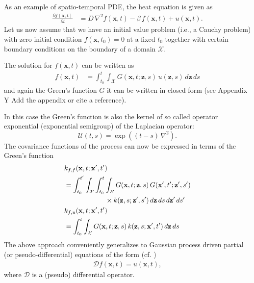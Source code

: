 \documentclass[journal]{IEEEtran}
\newcommand{\simo}[1]{{\color{red}#1}}
\begin{document}
As an example of spatio-temporal PDE, the heat equation is given as
\begin{align*}
  \frac{\partial f(\mathbf{x},t)}{\partial t} &= D \, \nabla^2 f(\mathbf{x},t) - \beta \, f(\mathbf{x},t) + u(\mathbf{x},t).
\end{align*}
%
Let us now assume that we have an initial value problem (i.e., a Cauchy problem) with zero initial condition $f(\mathbf{x},t_0) = 0$ at a fixed $t_0$ together with certain boundary conditions on the boundary of a domain $\mathcal{X}$. 

The solution for $f(\mathbf{x},t)$ can be written as
\begin{align*}
f(\mathbf{x},t) & = \int_{t_0}^t \int_{\mathcal{X}} G(\mathbf{x}, t;  \mathbf{z}, s)\,
                u(\mathbf{z},s)\,d\mathbf{z}\,ds
\end{align*}
%
and again the Green's function $G$ it can be written in closed form (see Appendix Y \simo{Add the appendix or cite a reference}).

In this case the Green's function is also the kernel of so called operator exponential (exponential semigroup) of the Laplacian operator:
%
\begin{equation}
  \mathcal{U}(t, s) = \exp\left( (t-s) \, \nabla^2 \right).
\end{equation}
%
The covariance functions of the process can now be expressed in terms of the Green's function
%
\begin{equation}
\begin{split}
  &k_{f,f}(\mathbf{x}, t; \mathbf{x}', t') \\
  &=
  \int_{t_0}^{t'} \int_{\mathcal{X}} \int_{t_0}^{t}  \int_{\mathcal{X}} 
  G(\mathbf{x}, t; \mathbf{z}, s) \,
  G(\mathbf{x}', t'; \mathbf{z}', s') \\ 
   &\qquad \qquad \qquad \times
  k(\mathbf{z}, s; \mathbf{z}', s') \, d\mathbf{z} \, ds \, d\mathbf{z}' \, ds' \\
  &k_{f,u}(\mathbf{x}, t; \mathbf{x}', t') \\
  &=
  \int_{t_0}^{t}  \int_{\mathcal{X}} 
  G(\mathbf{x}, t; \mathbf{z}, s) \,
  k(\mathbf{z}, s; \mathbf{x}', t') \, d\mathbf{z} \, ds 
\end{split}
\notag
\end{equation}
%
The above approach conveniently generalizes to Gaussian process driven partial (or pseudo-differential) equations of the form (cf. \cite{Sarkka:2011})
\begin{align*}
  \mathcal{D} f(\mathbf{x},t) = u(\mathbf{x},t),
\end{align*}
%
where $\mathcal{D}$ is a (pseudo) differential operator.
\end{document}
